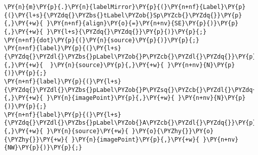 \begin{Verbatim}[commandchars=\\\{\}]
\PY{n}{m}\PY{p}{.}\PY{n}{labelMirror}\PY{p}{(}\PY{n+nf}{Label}\PY{p}{(}\PY{l+s}{\PYZdq{}\PYZbs{}tLabel\PYZob{}Sp\PYZcb{}\PYZdq{}}\PY{p}{,}\PY{+w}{ }\PY{n+nf}{align}\PY{o}{=}\PY{n+nv}{SE}\PY{p}{)}\PY{p}{,}\PY{+w}{ }\PY{l+s}{\PYZdq{}\PYZdq{}}\PY{p}{)}\PY{p}{;}
\PY{n+nf}{dot}\PY{p}{(}\PY{n}{source}\PY{p}{)}\PY{p}{;}
\PY{n+nf}{label}\PY{p}{(}\PY{l+s}{\PYZdq{}\PYZdl{}\PYZbs{}pLabel\PYZob{}P\PYZcb{}\PYZdl{}\PYZdq{}}\PY{p}{,}\PY{+w}{  }\PY{n}{source}\PY{p}{,}\PY{+w}{ }\PY{n+nv}{N}\PY{p}{)}\PY{p}{;}
\PY{n+nf}{label}\PY{p}{(}\PY{l+s}{\PYZdq{}\PYZdl{}\PYZbs{}pLabel\PYZob{}P\PYZsq{}\PYZcb{}\PYZdl{}\PYZdq{}}\PY{p}{,}\PY{+w}{ }\PY{n}{imagePoint}\PY{p}{,}\PY{+w}{ }\PY{n+nv}{N}\PY{p}{)}\PY{p}{;}
\PY{n+nf}{label}\PY{p}{(}\PY{l+s}{\PYZdq{}\PYZdl{}\PYZbs{}pLabel\PYZob{}A\PYZcb{}\PYZdl{}\PYZdq{}}\PY{p}{,}\PY{+w}{ }\PY{n}{source}\PY{+w}{ }\PY{o}{\PYZhy{}}\PY{o}{\PYZhy{}}\PY{+w}{ }\PY{n}{imagePoint}\PY{p}{,}\PY{+w}{ }\PY{n+nv}{NW}\PY{p}{)}\PY{p}{;}
\end{Verbatim}
